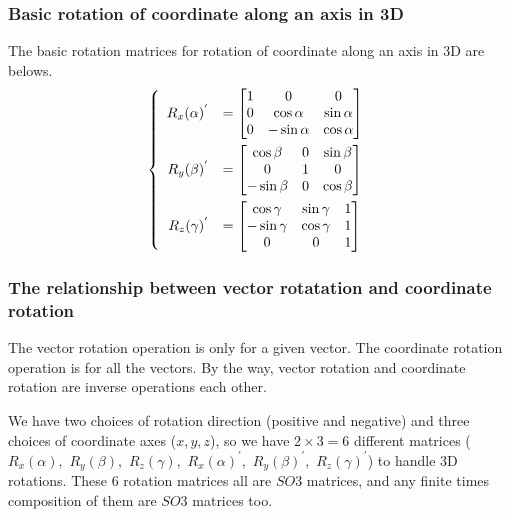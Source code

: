 \documentclass{article} %
\numberwithin{equation}{section} %
\begin{document}
\subsubsection{Basic rotation of coordinate along an axis in 3D}
The basic rotation matrices for rotation of coordinate along an axis in 3D are belows.
\begin{equation}\label{3d_rotation_matrix_rot_axis}
	\left\{
		\begin{array}{rl}
			R_x(\alpha)^{'}\vspace{1ex} &=\begin{bmatrix}
				1 & 0 & 0\\
				0 & \cos\alpha & \sin\alpha\\
				0 & -\sin\alpha & \cos\alpha
			\end{bmatrix}\\
			R_y(\beta)^{'}\vspace{1ex} &=\begin{bmatrix}
				\cos\beta & 0 & \sin\beta\\
				0 & 1 & 0\\
				-\sin\beta & 0 & \cos\beta
			\end{bmatrix}\\
			R_z(\gamma)^{'} &=\begin{bmatrix}
				\cos\gamma & \sin\gamma & 1\\
				-\sin\gamma & \cos\gamma & 1\\
				0 & 0 & 1
			\end{bmatrix}
		\end{array}
	\right.
\end{equation}

\subsubsection{The relationship between vector rotatation and coordinate rotation}

The vector rotation operation is only for a given vector.
The coordinate rotation operation is for all the vectors.
By the way, vector rotation and coordinate rotation are inverse operations each other.

We have two choices of rotation direction (positive and negative) and three choices of coordinate axes ($x,y,z$), so we have $2\times 3=6$ different matrices ($R_x(\alpha),$ $R_y(\beta),$ $R_z(\gamma),$ $R_x(\alpha)^{'},$ $R_y(\beta)^{'},$ $R_z(\gamma)^{'}$) to handle 3D rotations.
These 6 rotation matrices all are $SO3$ matrices, and any finite times composition of them are $SO3$ matrices too.
\end{document}
